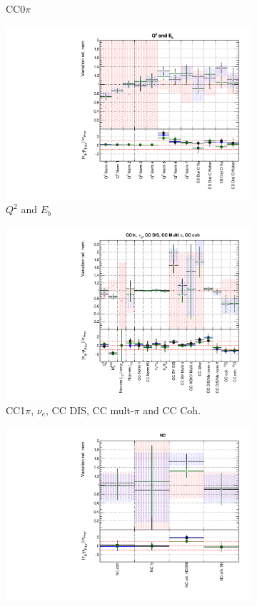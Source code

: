 \begin{figure}
\begin{subfigure}{0.49\textwidth}
  \caption{CC0$\pi$}
\end{subfigure}
\begin{subfigure}{0.49\textwidth}
  \centering
  \includegraphics[width=0.9\linewidth]{figs/newolddatafitsxsec_2}
  \caption{$Q^2$ and $E_b$}
\end{subfigure}
\begin{subfigure}{0.49\textwidth}
  \centering
  \includegraphics[width=0.9\linewidth]{figs/newolddatafitsxsec_3}
  \caption{CC1$\pi$, $\nu_e$, CC DIS, CC mult-$\pi$ and CC Coh.}
\end{subfigure}
\begin{subfigure}{0.49\textwidth}
  \centering
  \includegraphics[width=0.9\linewidth]{figs/newolddatafitsxsec_4}

\end{subfigure}
\end{figure}
